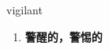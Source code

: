 
\begin{frame}
{\huge vigilant}
\begin{center}
\begin{enumerate}\Large
  \item \textbf{警醒的，警惕的}
\end{enumerate}
\end{center}
\end{frame}
